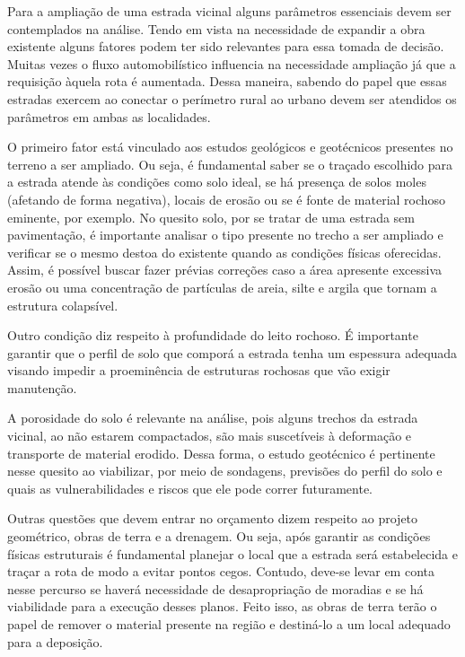 
Para a ampliação de uma estrada vicinal alguns parâmetros essenciais devem ser contemplados na análise. Tendo em vista na necessidade de expandir a obra existente alguns fatores podem ter sido relevantes para essa tomada de decisão. Muitas vezes o fluxo automobilístico influencia na necessidade ampliação já que a requisição àquela rota é aumentada. Dessa maneira, sabendo do papel que essas estradas exercem ao conectar o perímetro rural ao urbano devem ser atendidos os parâmetros em ambas as localidades.

O primeiro fator está vinculado aos estudos geológicos e geotécnicos presentes no terreno a ser ampliado. Ou seja, é fundamental saber se o traçado escolhido para a estrada atende às condições como solo ideal, se há presença de solos moles (afetando de forma negativa), locais de erosão ou se é fonte de material rochoso eminente, por exemplo. No quesito solo, por se tratar de uma estrada sem pavimentação, é importante analisar o tipo presente no trecho a ser ampliado e verificar se o mesmo destoa do existente quando as condições físicas oferecidas. Assim, é possível buscar fazer  prévias correções caso a área apresente excessiva erosão ou uma concentração de partículas de areia, silte e argila que tornam a estrutura colapsível.

Outro condição diz respeito à profundidade do leito rochoso. É importante garantir que o perfil de solo que comporá a estrada tenha um espessura adequada visando impedir a proeminência de estruturas rochosas que vão exigir manutenção. 

A porosidade do solo é relevante na análise, pois alguns trechos da estrada vicinal, ao não estarem compactados, são mais suscetíveis à deformação e transporte de material erodido. Dessa forma, o estudo geotécnico é pertinente nesse quesito ao viabilizar, por meio de sondagens, previsões do perfil do solo e quais as vulnerabilidades e riscos que ele pode correr futuramente.

Outras questões que devem entrar no orçamento dizem respeito ao projeto geométrico, obras de terra e a drenagem. Ou seja, após garantir as condições físicas estruturais é fundamental planejar o local que a estrada será estabelecida e traçar a rota de modo a evitar pontos cegos. Contudo, deve-se levar em conta nesse percurso se haverá necessidade de desapropriação de moradias e se há viabilidade para a execução desses planos. Feito isso, as obras de terra terão o papel de remover o material presente na região e destiná-lo a um local adequado para a deposição. 

